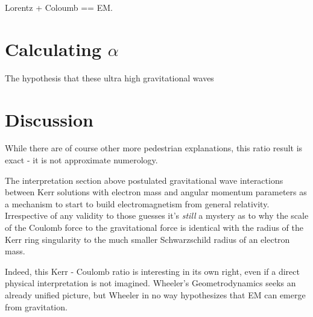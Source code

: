 \documentclass[../rzero]{subfiles}
\begin{document}
  Lorentz + Coloumb == EM. 

 \section{Calculating $\alpha$} 
 The hypothesis that these ultra high gravitational waves 

\section{Discussion}
While there are of course other more pedestrian explanations, this ratio result is exact - it is not approximate numerology.

The interpretation section above postulated gravitational wave interactions between Kerr solutions with electron mass and angular momentum parameters as a mechanism to start to build electromagnetism from general relativity. Irrespective of any validity to those guesses it's \textit{still} a mystery as to why the scale of the Coulomb force to the gravitational force is identical with the radius of the Kerr ring singularity to the much smaller Schwarzschild radius of an electron mass.

Indeed, this Kerr - Coulomb ratio is interesting in its own right, even if a direct physical interpretation is not imagined. Wheeler's Geometrodynamics \cite{Wheeler1957a} seeks an already unified picture, but Wheeler in no way hypothesizes that EM can emerge from gravitation. 
\end{document}
